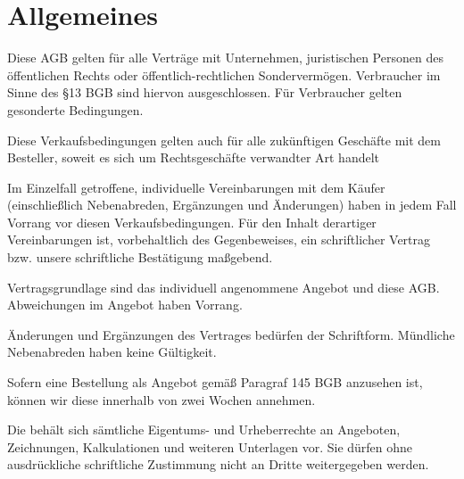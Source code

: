 \documentclass[fontsize=12pt,parskip=half]{scrartcl}
\author{}
\begin{document}

\subject{\large Allgemeine Geschäftsbedingungen - Geschäftskunden}
\title{\large \companyName}
\subtitle{\normalsize \companyLocation}
\date{\small \effDate\ (V\version)}
\maketitle

\tableofcontents

\newpage

\section{Allgemeines}

\begin{contract}

\Clause[title={Geltungsbereich}]

Diese AGB gelten für alle Verträge mit Unternehmen, juristischen Personen des öffentlichen Rechts oder öffentlich-rechtlichen Sondervermögen. Verbraucher im Sinne des §13 BGB sind hiervon ausgeschlossen. Für Verbraucher gelten gesonderte Bedingungen.

Diese Verkaufsbedingungen gelten auch für alle zukünftigen Geschäfte mit dem Besteller, soweit es sich um Rechtsgeschäfte verwandter Art handelt 

Im Einzelfall getroffene, individuelle Vereinbarungen mit dem Käufer (einschließlich Nebenabreden, Ergänzungen und Änderungen) haben in jedem Fall Vorrang vor diesen Verkaufsbedingungen. Für den Inhalt derartiger Vereinbarungen ist, vorbehaltlich des Gegenbeweises, ein schriftlicher Vertrag bzw. unsere schriftliche Bestätigung maßgebend.

\Clause[title={Vertragsgrundlagen}]

Vertragsgrundlage sind das individuell angenommene Angebot und diese AGB. Abweichungen im Angebot haben Vorrang. 

Änderungen und Ergänzungen des Vertrages bedürfen der Schriftform. Mündliche Nebenabreden haben keine Gültigkeit.

Sofern eine Bestellung als Angebot gemäß Paragraf 145 BGB anzusehen ist, können wir diese innerhalb von zwei Wochen annehmen.

\Clause[title={Unterlagen und Rechte}]

Die \companyName{} behält sich sämtliche Eigentums- und Urheberrechte an Angeboten, Zeichnungen, Kalkulationen und weiteren Unterlagen vor. Sie dürfen ohne ausdrückliche schriftliche Zustimmung nicht an Dritte weitergegeben werden.


\end{contract}
\end{document}
